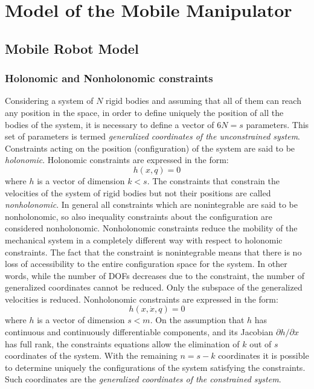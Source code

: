 
\chapter{Model of the Mobile Manipulator}
\label{chapter2}
\section{Mobile Robot Model}
\subsection{Holonomic and Nonholonomic constraints}
Considering a system of $N$ rigid bodies and assuming that all of them can reach any position in the space, in order to define uniquely the position of all the bodies of the system, it is necessary to define a vector of $6N = s$ parameters. This set of parameters is termed \textit{generalized coordinates of the unconstrained system}. 
Constraints acting on the position (configuration) of the system are said to be  \textit{holonomic}. 
Holonomic constraints are expressed in the form:
\begin{equation}
h\left( x,q \right) =0
\end{equation}
where $h$ is a vector of dimension $k<s$.
The constraints that constrain the velocities of the system of rigid bodies but not their positions are called \textit{nonholonomic}. In general all constraints which are nonintegrable are said to be nonholonomic, so also inequality constraints about the configuration are considered nonholonomic. 
Nonholonomic constraints reduce the mobility of the mechanical system in a completely different way with respect to holonomic constraints. The fact that the constraint is nonintegrable means that there is no loss of accessibility to the entire configuration space for the system. In other words, while the number of DOFs decreases due to the constraint, the number of generalized coordinates cannot be reduced. Only the subspace of the generalized velocities is reduced.
Nonholonomic constraints are expressed in the form:
\begin{equation}
h( x,\dot{x},q) =0
\end{equation}
where $h$ is a vector of dimension $s<m$.
On the assumption that $h$ has continuous and continuously differentiable components, and its Jacobian $ \partial h/\partial x $ has full rank, the constraints equations allow the elimination of $k$ out of $s$ coordinates of the system. With the remaining $n=s-k$ coordinates it is possible to determine uniquely the configurations of the system satisfying the constraints. Such coordinates are the \textit{generalized coordinates of the constrained system}.\\
